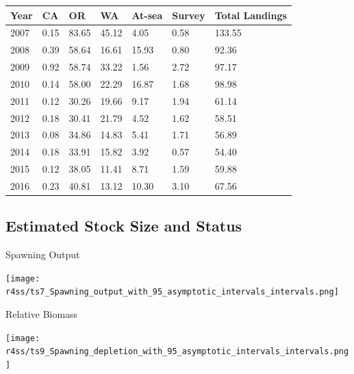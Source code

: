 \documentclass[pdf]{beamer}\usepackage[]{graphicx}\usepackage[]{color}
\begin{document}
\begin{frame}[t]
  \begin{table}[ht]
  \centering
  \begin{tabular}{p{0.4in}p{0.4in}p{0.4in}p{0.4in}p{0.4in}p{0.4in}p{0.6in}}
  Year & CA & OR & WA & At-sea & Survey & Total Landings \\ 
  \hline
  2007 & 0.15 & 83.65 & 45.12 & 4.05 & 0.58 & 133.55 \\ 
  2008 & 0.39 & 58.64 & 16.61 & 15.93 & 0.80 & 92.36 \\ 
  2009 & 0.92 & 58.74 & 33.22 & 1.56 & 2.72 & 97.17 \\ 
  2010 & 0.14 & 58.00 & 22.29 & 16.87 & 1.68 & 98.98 \\ 
  2011 & 0.12 & 30.26 & 19.66 & 9.17 & 1.94 & 61.14 \\ 
  2012 & 0.18 & 30.41 & 21.79 & 4.52 & 1.62 & 58.51 \\ 
  2013 & 0.08 & 34.86 & 14.83 & 5.41 & 1.71 & 56.89 \\ 
  2014 & 0.18 & 33.91 & 15.82 & 3.92 & 0.57 & 54.40 \\ 
  2015 & 0.12 & 38.05 & 11.41 & 8.71 & 1.59 & 59.88 \\ 
  2016 & 0.23 & 40.81 & 13.12 & 10.30 & 3.10 & 67.56 \\ 
  \hline
  \end{tabular}
  \end{table}
\end{frame}


\subsection{Estimated Stock Size and Status}
\begin{frame}{Spawning Output}
  \begin{center}
    \texttt{[image: r4ss/ts7\_Spawning\_output\_with\_95\_asymptotic\_intervals\_intervals.png]}
  \end{center}
\end{frame}


\begin{frame}{Relative Biomass}
  \begin{center}
    \texttt{[image: r4ss/ts9\_Spawning\_depletion\_with\_95\_asymptotic\_intervals\_intervals.png]}
  \end{center}
\end{frame}
\end{document}
